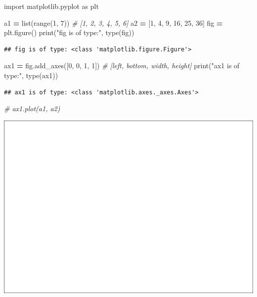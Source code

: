 \documentclass[
]{book}
\newenvironment{Shaded}{\begin{snugshade}}{\end{snugshade}}
\newcommand{\BuiltInTok}[1]{#1}
\newcommand{\CommentTok}[1]{\textcolor[rgb]{0.56,0.35,0.01}{\textit{#1}}}
\newcommand{\DecValTok}[1]{\textcolor[rgb]{0.00,0.00,0.81}{#1}}
\newcommand{\ImportTok}[1]{#1}
\newcommand{\NormalTok}[1]{#1}
\newcommand{\OperatorTok}[1]{\textcolor[rgb]{0.81,0.36,0.00}{\textbf{#1}}}
\newcommand{\StringTok}[1]{\textcolor[rgb]{0.31,0.60,0.02}{#1}}
\theoremstyle{definition}
\theoremstyle{definition}
\theoremstyle{definition}
\theoremstyle{definition}
\theoremstyle{remark}
\begin{document}
\begin{Shaded}
\begin{Highlighting}[]
\ImportTok{import}\NormalTok{ matplotlib.pyplot }\ImportTok{as}\NormalTok{ plt}

\NormalTok{a1 }\OperatorTok{=} \BuiltInTok{list}\NormalTok{(}\BuiltInTok{range}\NormalTok{(}\DecValTok{1}\NormalTok{, }\DecValTok{7}\NormalTok{)) }\CommentTok{\# [1, 2, 3, 4, 5, 6]}
\NormalTok{a2 }\OperatorTok{=}\NormalTok{ [}\DecValTok{1}\NormalTok{, }\DecValTok{4}\NormalTok{, }\DecValTok{9}\NormalTok{, }\DecValTok{16}\NormalTok{, }\DecValTok{25}\NormalTok{, }\DecValTok{36}\NormalTok{]}
\NormalTok{fig }\OperatorTok{=}\NormalTok{ plt.figure()}
\BuiltInTok{print}\NormalTok{(}\StringTok{"fig is of type:"}\NormalTok{, }\BuiltInTok{type}\NormalTok{(fig))}
\end{Highlighting}
\end{Shaded}

\begin{verbatim}
## fig is of type: <class 'matplotlib.figure.Figure'>
\end{verbatim}

\begin{Shaded}
\begin{Highlighting}[]
\NormalTok{ax1 }\OperatorTok{=}\NormalTok{ fig.add\_axes([}\DecValTok{0}\NormalTok{, }\DecValTok{0}\NormalTok{, }\DecValTok{1}\NormalTok{, }\DecValTok{1}\NormalTok{]) }\CommentTok{\# [left, bottom, width, height]}
\BuiltInTok{print}\NormalTok{(}\StringTok{"ax1 is of type:"}\NormalTok{, }\BuiltInTok{type}\NormalTok{(ax1))}
\end{Highlighting}
\end{Shaded}

\begin{verbatim}
## ax1 is of type: <class 'matplotlib.axes._axes.Axes'>
\end{verbatim}

\begin{Shaded}
\begin{Highlighting}[]
\CommentTok{\# ax1.plot(a1, a2)}
\end{Highlighting}
\end{Shaded}

\includegraphics{202403181222-MatPlotLib_files/figure-latex/unnamed-chunk-11-11.pdf}
\end{document}
